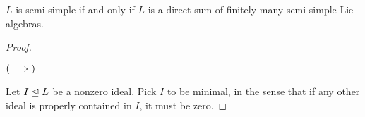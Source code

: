 \begin{boxtheorem}\label{SP:Thm:Structure}
    $L$ is semi-simple if and only if $L$ is a direct sum of finitely many semi-simple Lie algebras.
\end{boxtheorem}

\begin{proof}
    \begin{description}
        \item[$\left( \implies \right)$] 
    \end{description}
    Let $I \trianglelefteq L$ be a nonzero ideal. Pick $I$ to be minimal, in the sense that if any other ideal is properly contained in $I$, it must be zero.
\end{proof}
